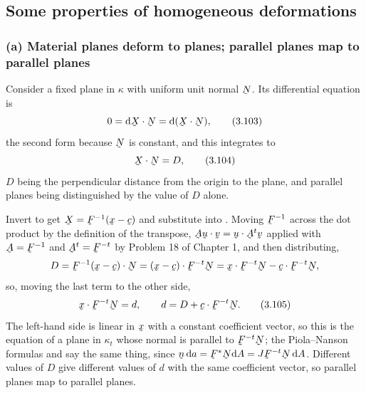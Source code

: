 \subsection{Some properties of homogeneous deformations}
\label{sec:homogprop}

\subsubsection*{(a) Material planes deform to planes; parallel planes map
to parallel planes}

Consider a fixed plane in $\kappa$ with uniform unit normal $\bN$. Its
differential equation is
\begin{equation}
   0=\ip{\dl\bX}{\bN}=\dl(\ip{\bX}{\bN}),
   \tag{3.103}\label{eq:3.103}
\end{equation}
the second form because $\bN$ is constant, and this integrates to
\begin{equation}
   \ip{\bX}{\bN}=D ,
   \tag{3.104}\label{eq:3.104}
\end{equation}
$D$ being the perpendicular distance from the origin to the plane, and
parallel planes being distinguished by the value of $D$ alone.

Invert  to get $\bX=\bF^{-1}(\bx-\bc)$ and substitute into
. Moving $\bF^{-1}$ across the dot product by the definition of
the transpose, $\ip{\bA\bu}{\bv}=\ip{\bu}{\bA^{t}\bv}$ applied with
$\bA=\bF^{-1}$ and $\bA^{t}=\bF^{-t}$ by Problem 18 of Chapter 1, and
then distributing,
\[
   D=\ip{\bF^{-1}(\bx-\bc)}{\bN}
    =\ip{(\bx-\bc)}{\bF^{-t}\bN}
    =\ip{\bx}{\bF^{-t}\bN}-\ip{\bc}{\bF^{-t}\bN},
\]
so, moving the last term to the other side,
\begin{equation}
   \ip{\bx}{\bF^{-t}\bN}=d,\qquad d=D+\ip{\bc}{\bF^{-t}\bN}.
   \tag{3.105}\label{eq:3.105}
\end{equation}
The
left-hand side is linear in $\bx$ with a constant coefficient vector, so
this is the equation of a plane in $\kappa_{t}$ whose normal is parallel
to $\bF^{-t}\bN$; the Piola--Nanson formulas  and  say the
same thing, since $\bn\,\dl a=\bF^{*}\bN\dl A=J\bF^{-t}\bN\,\dl A$.
Different values of $D$ give different values of $d$ with the same
coefficient vector, so parallel planes map to parallel planes.

